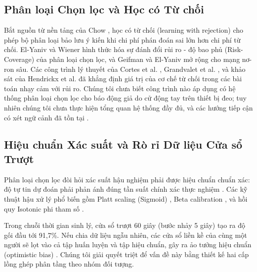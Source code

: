 \documentclass[conference]{IEEEtran}
\begin{document}
\subsection{Phân loại Chọn lọc và Học có Từ chối}
Bắt nguồn từ nền tảng của Chow \cite{chow1970optimum}, học có từ chối (learning with rejection) cho phép bộ phân loại bảo lưu ý kiến khi chi phí phán đoán sai lớn hơn chi phí từ chối. El-Yaniv và Wiener \cite{elyaniv2010foundations} hình thức hóa sự đánh đổi rủi ro - độ bao phủ (Risk-Coverage) của phân loại chọn lọc, và Geifman và El-Yaniv \cite{geifman2017selective, geifman2019selectivenet} mở rộng cho mạng nơ-ron sâu. Các công trình lý thuyết của Cortes et al. \cite{cortes2016learning}, Grandvalet et al. \cite{grandvalet2008support}, và khảo sát của Hendrickx et al. \cite{hendrickx2024machine} đã khẳng định giá trị của cơ chế từ chối trong các bài toán nhạy cảm với rủi ro. Chúng tôi chưa biết công trình nào áp dụng có hệ thống phân loại chọn lọc cho báo động giả do cử động tay trên thiết bị đeo; tuy nhiên chúng tôi chưa thực hiện tổng quan hệ thống đầy đủ, và các hướng tiếp cận có xét ngữ cảnh đã tồn tại \cite{gjoreski2017monitoring}.

\subsection{Hiệu chuẩn Xác suất và Rò rỉ Dữ liệu Cửa sổ Trượt}
Phân loại chọn lọc đòi hỏi xác suất hậu nghiệm phải được hiệu chuẩn chuẩn xác: độ tự tin dự đoán phải phản ánh đúng tần suất chính xác thực nghiệm \cite{guo2017calibration, naeini2015obtaining}. Các kỹ thuật hậu xử lý phổ biến gồm Platt scaling (Sigmoid) \cite{platt1999probabilistic}, Beta calibration \cite{kull2017beta}, và hồi quy Isotonic phi tham số \cite{zadrozny2002transforming, niculescu2005predicting}.

Trong chuỗi thời gian sinh lý, cửa sổ trượt 60 giây (bước nhảy 5 giây) tạo ra độ gối đầu tới 91,7\%. Nếu chia dữ liệu ngẫu nhiên, các cửa sổ liền kề của cùng một người sẽ lọt vào cả tập huấn luyện và tập hiệu chuẩn, gây ra ảo tưởng hiệu chuẩn (optimistic bias) \cite{saeb2017need, little2017using}. Chúng tôi giải quyết triệt để vấn đề này bằng thiết kế hai cấp lồng ghép phân tầng theo nhóm đối tượng.
\end{document}
